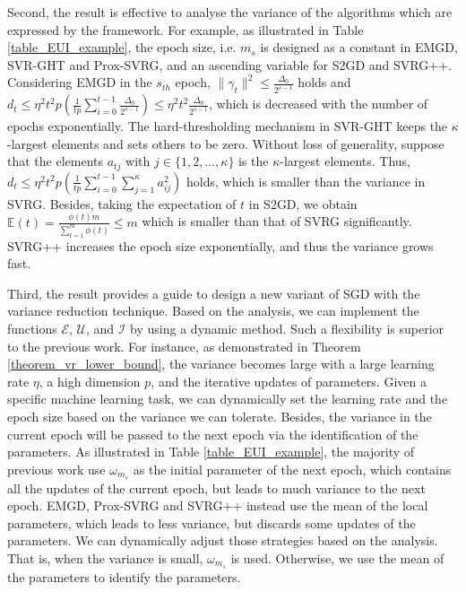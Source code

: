 \documentclass[letterpaper]{article}
\begin{document}
Second, the result is effective to analyse the variance of the algorithms which are expressed by the framework. For example, as illustrated in Table \ref{table_EUI_example}, the epoch size, i.e. $m_s$ is designed as a constant in EMGD, SVR-GHT and Prox-SVRG, and  an ascending variable for  S2GD and SVRG++. Considering EMGD in the $s_{th}$ epoch,  $\parallel \gamma_t \parallel^2 \le \frac{\Delta_0}{2^{s-1}}$ holds and $d_t\mathrm{\le} \eta^2 t^2 p \left( \frac{1}{tp}\sum\limits_{i=0}^{t-1}   \frac{\Delta_0}{2^{s-1}} \right) \mathrm{\le}  \eta^2t^2 \frac{\Delta_0}{2^{s-1}}$, which is decreased with the number of epochs exponentially. The hard-thresholding mechanism in SVR-GHT keeps the $\kappa$-largest elements and sets others to be zero. Without loss of generality, suppose that the elements $a_{tj}$ with $j\mathrm{\in}\{1,2, ..., \kappa\}$ is the $\kappa$-largest elements. Thus, $d_t \mathrm{\le}  \eta^2 t^2p  \left( \frac{1}{tp}\sum\limits_{i=0}^{t-1}   \sum\limits_{j=1}^{\kappa}   a_{ij}^2 \right)$  holds, which is smaller than the variance in SVRG. Besides, taking the expectation of $t$ in S2GD, we obtain $\mathbb{E}(t)=\frac{\phi(t)m}{\sum_{t=1}^m \phi(t)} \mathrm{\le}  m$ which is smaller than that of SVRG significantly. SVRG++ increases the epoch size exponentially, and thus the variance grows fast.  

Third, the result provides a guide to design a new variant of SGD with the variance reduction technique.   Based on the analysis, we can implement the functions  $\mathcal{E}$, $\mathcal{U}$, and $\mathcal{I}$ by using a dynamic method. Such a flexibility  is superior to the previous work.  For instance, as demonstrated in Theorem \ref{theorem_vr_lower_bound}, the variance becomes large with a large learning rate $\eta$, a high dimension $p$, and the iterative updates of parameters.  Given a specific machine learning task, we can dynamically set  the learning rate and the epoch size based on the variance we can tolerate. Besides, the variance in the current epoch will be passed to the next epoch via the identification of the parameters. As illustrated in Table \ref{table_EUI_example},  the majority of previous work use $\omega_{m_s}$ as the initial parameter of the next epoch, which contains all the updates of the current epoch, but leads to much variance to the next epoch. EMGD, Prox-SVRG and SVRG++ instead use the mean of  the local parameters, which leads to less variance, but discards some updates of the parameters. We can dynamically adjust those strategies based on the analysis. That is, when the variance is small, $\omega_{m_s}$ is used. Otherwise, we use the mean of the parameters to identify the parameters. 
\end{document}

